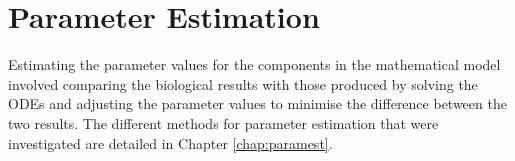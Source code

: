 
\section{Parameter Estimation}
Estimating the parameter values for the components in the mathematical model involved comparing the biological results with those produced by solving the ODEs and adjusting the parameter values to minimise the difference between the two results. The different methods for parameter estimation that were investigated are detailed in Chapter \ref{chap:paramest}.